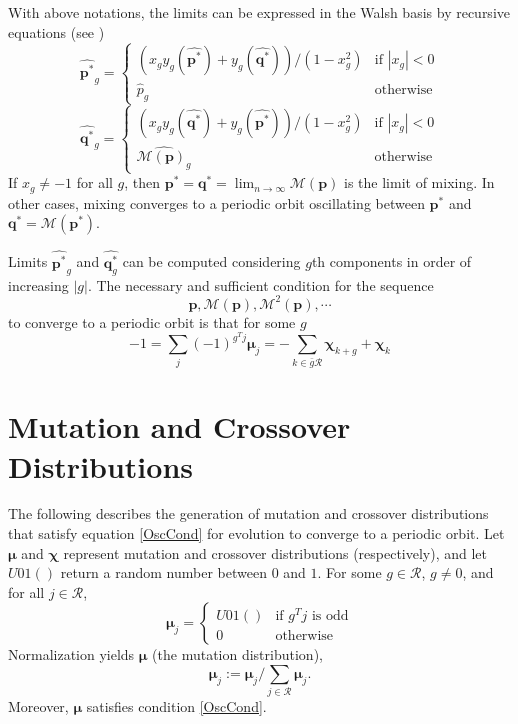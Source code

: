 With above notations, the limits can be expressed in the Walsh basis by recursive equations (see \cite{Vose1999})
\begin{equation}
\label{lt1}
\widehat{{\bm p}^{\ast}}_g  = \begin{cases}
    (x_g y_g(\widehat{{\bm p}^{\ast}}) + y_g(\widehat{{\bm q}^{\ast}}))/(1-x_g^2)  & \text{if $|x_g| < 0$}\\
    \widehat{p}_g  & \text{otherwise}
  \end{cases}
\end{equation}
\begin{equation}
\label{lt2}
\widehat{{\bm q}^{\ast}}_g  = \begin{cases}
    (x_g y_g(\widehat{{\bm q}^{\ast}}) + y_g(\widehat{{\bm p}^{\ast}}))/(1-x_g^2)  & \text{if $|x_g| < 0$}\\
    \widehat{\mathcal{M}({\bm p})_g}  & \text{otherwise}
  \end{cases}
\end{equation}
If $x_g \neq -1$ for all $g$, then ${\bm p}^\ast = {\bm q}^\ast = \lim_{n \rightarrow \infty} \mathcal{M}({\bm p})$ is the limit of mixing. In other cases, 
mixing converges to a periodic orbit oscillating between ${\bm p}^\ast$ and ${\bm q}^\ast = \mathcal{M}({\bm p}^\ast)$.

Limits $\widehat{{\bm p}^{\ast}}_g$ and $\widehat{{\bm q}^{\ast}_g}$ can be computed considering $g$th components in order of increasing $|g|$.
The necessary and sufficient condition for the sequence
\[
\bm{p}, \mathcal{M}({\bm p}), \mathcal{M}^2({\bm p}),\cdots
\]
to converge to a periodic orbit is that for some $g$
\begin{equation}
\label{OscCond}
-1 = \sum \limits_{j} (-1)^{g^T j} \bm{\mu}_j = - \sum \limits_{k \in \bar{g}\mathcal{R}} \bm{\chi}_{k+g} + \bm{\chi}_k
\end{equation}
 
\section{Mutation and Crossover Distributions}
The following describes the generation of mutation and crossover distributions that satisfy equation \ref{OscCond} 
for evolution to converge to a periodic orbit. 
Let $\bm{\mu}$ and $\bm{\chi}$ represent mutation and crossover distributions (respectively), 
and let $U01()$ return a random number between $0$ and $1$. For some $g \in \mathcal{R}$, $g \neq 0$, and for all $j \in \mathcal{R}$,
\begin{equation}
\label{MuDist}
\bm{\mu}_j = \begin{cases}
    U01() & \text{if $g^T j$ is odd}\\
    0 & \text{otherwise}
  \end{cases}
\end{equation}
Normalization yields $\bm{\mu}$ (the mutation distribution),
\[
\bm{\mu}_j := \bm{\mu}_j / \sum \limits_{j \in \mathcal{R} } \bm{\mu}_j.
\]
Moreover, $\bm{\mu}$ satisfies condition \ref{OscCond}.

